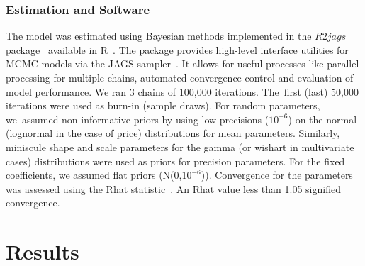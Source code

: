 \documentclass[sustainability,article,accept,moreauthors,pdftex,10pt,a4paper]{Definitions/mdpi}
\theoremstyle{mdpi}
\newcounter{re}
\theoremstyle{mdpidefinition}
\begin{document}
{\subsubsection{Estimation and Software}
\par{The model was estimated using Bayesian methods implemented in the $R2jags$ package~\cite{Su2015} available in R~\cite{R2018}. The package provides high-level interface utilities for MCMC models via the JAGS sampler~\cite{plummer2013jags}. It allows for useful processes like parallel processing for multiple chains, automated convergence control and evaluation of model performance. We ran 3 chains of 100,000 iterations. The~first (last) 50,000 iterations were used as burn-in (sample draws). For random parameters, we~assumed non-informative priors by using low precisions ($10^{-6}$) on the normal (lognormal in the case of price) distributions for mean parameters. Similarly, miniscule shape and scale parameters for the gamma (or wishart in multivariate cases) distributions were used as priors for precision parameters. For the fixed coefficients, we assumed flat priors (N(0,$10^{-6}$)). Convergence for the parameters was assessed using the Rhat statistic~\cite{Gelman1992}. An Rhat value less than 1.05 signified convergence.}


\section{Results \label{results}}
\unskip
}
\end{document}
